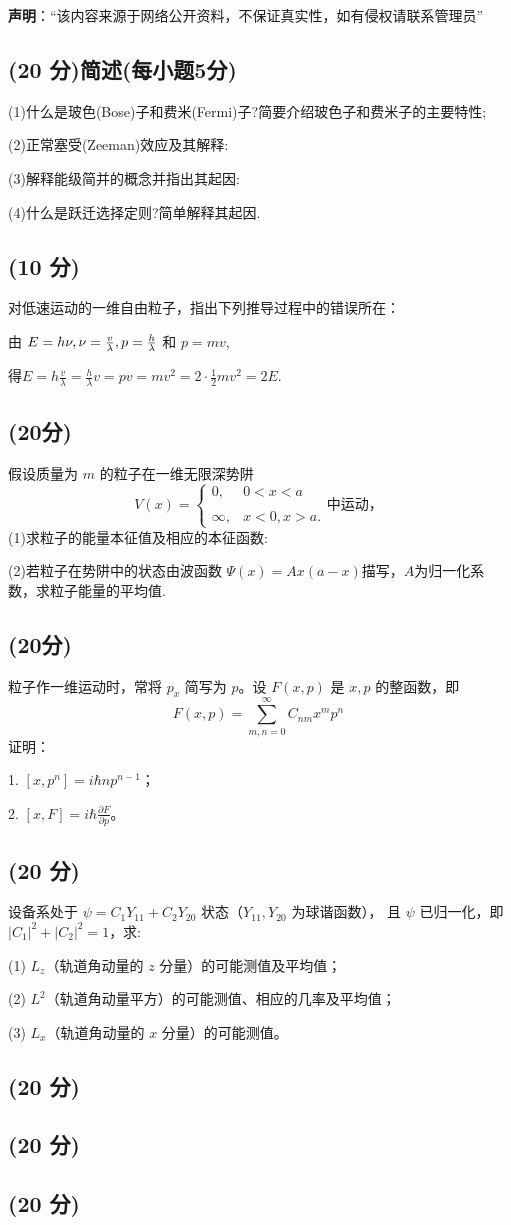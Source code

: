 
\textbf{声明}：“该内容来源于网络公开资料，不保证真实性，如有侵权请联系管理员”

\subsection{(20 分)简述(每小题5分)}
(1)什么是玻色(Bose)子和费米(Fermi)子?简要介绍玻色子和费米子的主要特性;

(2)正常塞受(Zeeman)效应及其解释:

(3)解释能级简并的概念并指出其起因:

(4)什么是跃迁选择定则?简单解释其起因.
\subsection{(10 分)}
对低速运动的一维自由粒子，指出下列推导过程中的错误所在：

由 $E = h \nu, \\ \nu = \frac{v}{\lambda}, \\ p = \frac{h}{\lambda}$ 和 $ p = mv$,

得$E = h \frac{v}{\lambda} = \frac{h}{\lambda} v = p v = mv^2 = 2 \cdot \frac{1}{2} mv^2 = 2E$.
\subsection{(20分)}
假设质量为 $m$ 的粒子在一维无限深势阱
\[V(x) = \begin{cases}    0, & 0<x<a \\\\   \infty, & x<0,x> a.    \end{cases}\text{中运动，}~\]
(1)求粒子的能量本征值及相应的本征函数:

(2)若粒子在势阱中的状态由波函数 $\Psi(x)=Ax(a-x)$描写，$A$为归一化系数，求粒子能量的平均值.
\subsection{(20分)}
粒子作一维运动时，常将 $p_x$ 简写为 $p$。设 $F(x, p)$ 是 $x, p$ 的整函数，即 
$$F(x, p) = \sum_{m,n=0}^{\infty} C_{nm} x^m p^n~$$
证明：

1. $[x, p^n] = i \hbar n p^{n-1}$；

2. $[x, F] = i \hbar \frac{\partial F}{\partial p}$。
\subsection{(20 分)}
设备系处于 $\psi = C_1 Y_{11} + C_2 Y_{20}$ 状态（$Y_{11}, Y_{20}$ 为球谐函数），
且 $\psi$ 已归一化，即 $|C_1|^2 + |C_2|^2 = 1$，求:

(1) $L_z$（轨道角动量的 $z$ 分量）的可能测值及平均值；

(2) $L^2$（轨道角动量平方）的可能测值、相应的几率及平均值；

(3) $L_x$（轨道角动量的 $x$ 分量）的可能测值。
\subsection{(20 分)}

\subsection{(20 分)}

\subsection{(20 分)}